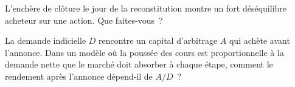 \begin{interviewq}\label{iq:s1:index-rebalancing:5}
L'enchère de clôture le jour de la reconstitution montre un fort déséquilibre acheteur sur une action. Que faites-vous~?
\end{interviewq}

\begin{interviewq}\label{iq:s1:index-rebalancing:6}
La demande indicielle $D$ rencontre un capital d'arbitrage $A$ qui achète avant l'annonce. Dans un modèle où la poussée des cours est proportionnelle à la demande nette que le marché doit absorber
à chaque étape, comment le rendement après l'annonce dépend-il de $A/D$~?
\end{interviewq}
